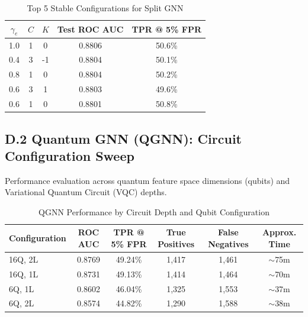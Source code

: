 \documentclass[12pt]{article}
\begin{document}
\begin{table}[H]
\centering
\caption{Top 5 Stable Configurations for Split GNN}
\vspace{0.5em}
\begin{tabular}{ccccc}
\toprule
\textbf{$\gamma_e$} & \textbf{$C$} & \textbf{$K$} & \textbf{Test ROC AUC} & \textbf{TPR @ 5\% FPR} \\ 
\midrule
1.0 & 1 &  0 & 0.8806 & 50.6\% \\
0.4 & 3 & -1 & 0.8804 & 50.1\% \\
0.8 & 1 &  0 & 0.8804 & 50.2\% \\
0.6 & 3 &  1 & 0.8803 & 49.6\% \\
0.6 & 1 &  0 & 0.8801 & 50.8\% \\
\bottomrule
\end{tabular}
\end{table}

\vspace{1.5em}

\subsection*{D.2 Quantum GNN (QGNN): Circuit Configuration Sweep}

Performance evaluation across quantum feature space dimensions (qubits) and Variational Quantum Circuit (VQC) depths.

\begin{table}[H]
\centering
\caption{QGNN Performance by Circuit Depth and Qubit Configuration}
\vspace{0.5em}
\begin{tabular}{lccccc}
\toprule
\textbf{Configuration} & \textbf{ROC AUC} & \textbf{TPR @ 5\% FPR} & \textbf{True Positives} & \textbf{False Negatives} & \textbf{Approx. Time} \\ 
\midrule
16Q, 2L & 0.8769 & 49.24\% & 1,417 & 1,461 & $\sim$75m \\
16Q, 1L & 0.8731 & 49.13\% & 1,414 & 1,464 & $\sim$70m \\
6Q, 1L  & 0.8602 & 46.04\% & 1,325 & 1,553 & $\sim$37m \\
6Q, 2L  & 0.8574 & 44.82\% & 1,290 & 1,588 & $\sim$38m \\
\bottomrule
\end{tabular}
\end{table}
\end{document}

